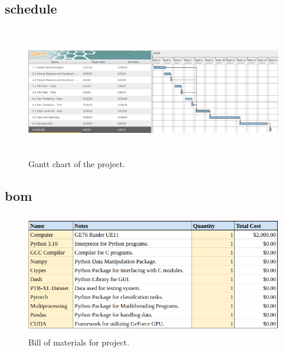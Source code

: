 \documentclass{article}
\begin{document}
\subsection{\gls{schedule}}
\begin{figure}[h]
    \centering
    \includegraphics[width=6.5in, height=2.25in]{Gantt.png}
    \caption{Gantt chart of the project.}
\end{figure}
\subsection{\gls{bom}}

\begin{figure}[h]
    \centering
    \includegraphics[width=5in, height=2.1in]{BOM.png}
    \caption{Bill of materials for project.}
\end{figure}

\newpage
\end{document}

